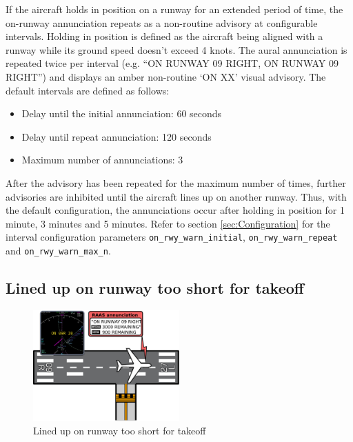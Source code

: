 \documentclass[a4paper,12pt]{article}
\newcommand{\confopt}[1]{\texttt{#1}}
\begin{document}
If the aircraft holds in position on a runway for an extended period of
time, the on-runway annunciation repeats as a non-routine advisory at
configurable intervals. Holding in position is defined as the aircraft
being aligned with a runway while its ground speed doesn't exceed 4
knots. The aural annunciation is repeated twice per interval (e.g. ``ON
RUNWAY 09 RIGHT, ON RUNWAY 09 RIGHT'') and displays an amber non-routine
`ON XX' visual advisory. The default intervals are defined as follows:

\begin{itemize}

\item Delay until the initial annunciation: 60 seconds

\item Delay until repeat annunciation: 120 seconds

\item Maximum number of annunciations: 3

\end{itemize}

\noindent After the advisory has been repeated for the maximum number of
times, further advisories are inhibited until the aircraft lines up on
another runway. Thus, with the default configuration, the annunciations
occur after holding in position for 1 minute, 3 minutes and 5 minutes.
Refer to section \ref{sec:Configuration} for the interval configuration
parameters
\confopt{on\_rwy\_warn\_initial},
\confopt{on\_rwy\_warn\_repeat} and \confopt{on\_rwy\_warn\_max\_n}.

\newpage
\subsection{Lined up on runway too short for takeoff}
\label{subsec:OnRwyShortMon}

\begin{figure}
\vspace{-2em}
\begin{center}
\includegraphics[width=0.5\textwidth]{../src/on_rwy_short.pdf}
\end{center}
\caption{Lined up on runway too short for takeoff}
\vspace{-2em}
\end{figure}
\end{document}
